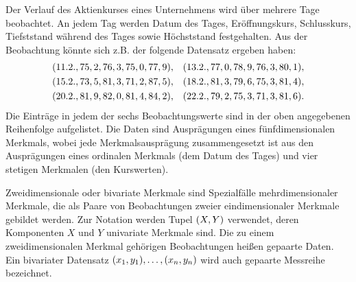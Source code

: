 \documentclass{lecture}
\begin{document}
    \begin{example}
        Der Verlauf des Aktienkurses eines Unternehmens wird über mehrere Tage beobachtet.
        An jedem Tag werden Datum des Tages, Eröffnungskurs, Schlusskurs, Tiefststand während des Tages sowie Höchststand festgehalten.
        Aus der Beobachtung könnte sich z.B. der folgende Datensatz ergeben haben:
        \begin{align*}
            &\parentheses*{\text{11.2.}, 75,2, 76,3, 75,0, 77,9}, & &\parentheses*{\text{13.2.}, 77,0, 78,9, 76,3, 80,1},\\
            &\parentheses*{\text{15.2.}, 73,5, 81,3, 71,2, 87,5}, & &\parentheses*{\text{18.2.}, 81,3, 79,6, 75,3, 81,4},\\
            &\parentheses*{\text{20.2.}, 81,9, 82,0, 81,4, 84,2}, & &\parentheses*{\text{22.2.}, 79,2, 75,3, 71,3, 81,6}.\\
        \end{align*}
        Die Einträge in jedem der sechs Beobachtungswerte sind in der oben angegebenen Reihenfolge aufgelistet.
        Die Daten sind Ausprägungen eines fünfdimensionalen Merkmals, wobei jede Merkmalsausprägung zusammengesetzt ist aus den Ausprägungen eines ordinalen Merkmals (dem Datum des Tages) und vier stetigen Merkmalen (den Kurswerten).
    \end{example}

    Zweidimensionale oder bivariate Merkmale sind Spezialfälle mehrdimensionaler Merkmale, die als Paare von Beobachtungen zweier eindimensionaler Merkmale gebildet werden.
    Zur Notation werden Tupel \(\parentheses*{X, Y}\) verwendet, deren Komponenten \(X\) und \(Y\) univariate Merkmale sind.
    Die zu einem zweidimensionalen Merkmal gehörigen Beobachtungen heißen gepaarte Daten.
    Ein bivariater Datensatz \(\parentheses*{x_1, y_1}, \ldots, \parentheses*{x_n, y_n}\) wird auch gepaarte Messreihe bezeichnet.
\end{document}
